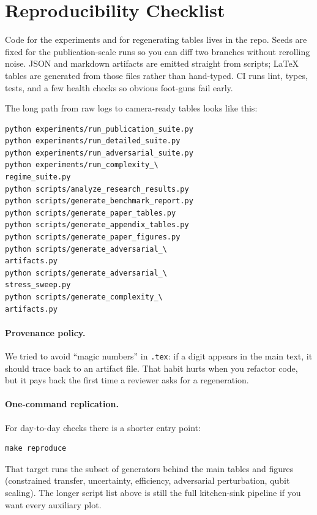 \section{Reproducibility Checklist}

Code for the experiments and for regenerating tables lives in the repo. Seeds are fixed for the publication-scale runs so you can diff two branches without rerolling noise. JSON and markdown artifacts are emitted straight from scripts; LaTeX tables are generated from those files rather than hand-typed. CI runs lint, types, tests, and a few health checks so obvious foot-guns fail early.

The long path from raw logs to camera-ready tables looks like this:
\begingroup
\scriptsize
\begin{verbatim}
python experiments/run_publication_suite.py
python experiments/run_detailed_suite.py
python experiments/run_adversarial_suite.py
python experiments/run_complexity_\
regime_suite.py
python scripts/analyze_research_results.py
python scripts/generate_benchmark_report.py
python scripts/generate_paper_tables.py
python scripts/generate_appendix_tables.py
python scripts/generate_paper_figures.py
python scripts/generate_adversarial_\
artifacts.py
python scripts/generate_adversarial_\
stress_sweep.py
python scripts/generate_complexity_\
artifacts.py
\end{verbatim}
\endgroup

\paragraph{Provenance policy.}
We tried to avoid ``magic numbers'' in \texttt{.tex}: if a digit appears in the main text, it should trace back to an artifact file. That habit hurts when you refactor code, but it pays back the first time a reviewer asks for a regeneration.

\paragraph{One-command replication.}
For day-to-day checks there is a shorter entry point:
\begingroup
\scriptsize
\begin{verbatim}
make reproduce
\end{verbatim}
\endgroup
That target runs the subset of generators behind the main tables and figures (constrained transfer, uncertainty, efficiency, adversarial perturbation, qubit scaling). The longer script list above is still the full kitchen-sink pipeline if you want every auxiliary plot.

